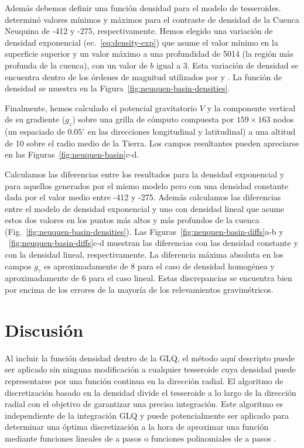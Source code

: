 Además debemos definir una función densidad para el modelo de tesseroides.
\citet{sigismondi2012} determinó valores mínimos y máximos para el contraste de
densidad de la Cuenca Neuquina de -412\kgpercubicm{} y -275\kgpercubicm{},
respectivamente.
Hemos elegido una variación de densidad exponencial (ec.~\ref{eq:density-exp})
que asume el valor mínimo en la superficie superior y un valor máximo a una
profundidad de 5014\m{} (la región más profunda de la cuenca), con un valor de
$b$ igual a 3.
Esta variación de densidad se encuentra dentro de los órdenes de magnitud
utilizados por \citet{cowie1990} y \citet{cordell1973}.
La función de densidad se muestra en la
Figura~\ref{fig:neuquen-basin-densities}.

Finalmente, hemos calculado el potencial gravitatorio $V$ y la componente
vertical de su gradiente ($g_z$) sobre una grilla de cómputo compuesta por
$159\times163$ nodos (un espaciado de $0.05^\circ$ en las direcciones
longitudinal y latitudinal) a una altitud de 10\km{} sobre el radio medio de la
Tierra.
Los campos resultantes pueden apreciarse en las
Figuras~\ref{fig:neuquen-basin}c-d.

Calculamos las diferencias entre los resultados para la densidad exponencial
y para aquellos generados por el mismo modelo pero con una densidad constante
dada por el valor medio entre -412\kgpercubicm{} y -275\kgpercubicm{}.
Además calculamos las diferencias entre el modelo de densidad exponencial y uno
con densidad lineal que asume estos dos valores en los puntos más altos y más
profundos de la cuenca (Fig.~\ref{fig:neuquen-basin-densities}).
Las Figuras~\ref{fig:neuquen-basin-diffs}a-b
y ~\ref{fig:neuquen-basin-diffs}c-d muestran las diferencias con las densidad
constante y con la densidad lineal, respectivamente.
La diferencia máxima absoluta en los campos $g_z$ es aproximadamente de
8\mGal{} para el caso de densidad homogénea y aproximadamente de 6\mGal{} para
el caso lineal.
Estas discrepancias se encuentra bien por encima de los errores de la mayoría
de los relevamientos gravimétricos.



\section{Discusión}

Al incluir la función densidad dentro de la \ac{GLQ}, el método aquí descripto
puede ser aplicado sin ninguna modificación a cualquier tesseroide cuya
densidad puede representarse por una función continua en la dirección radial.
El algoritmo de discretización basado en la densidad divide el tesseroide a lo
largo de la dirección radial con el objetivo de garantizar una precisa
integración.
Este algoritmo es independiente de la integración \ac{GLQ} y puede
potencialmente ser aplicado para determinar una óptima discretización a la hora
de aproximar una función mediante funciones lineales de a pasos \citep{lin2019}
o funciones polinomiales de a pasos \citep{fukushima2018}.

